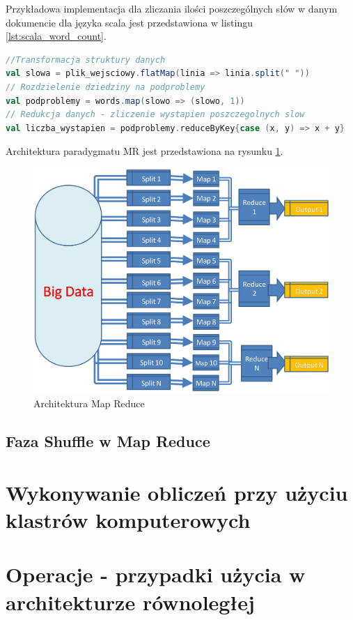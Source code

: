 \newline Przykładowa implementacja dla zliczania ilości poszczególnych słów w danym dokumencie dla języka scala jest przedstawiona w listingu \ref{lst:scala_word_count}.
\begin{lstlisting}[language=scala, caption={Przykład "Word Count"},captionpos=b, label={lst:scala_word_count}]
//Transformacja struktury danych
val slowa = plik_wejsciowy.flatMap(linia => linia.split(" "))
// Rozdzielenie dziedziny na podproblemy
val podproblemy = words.map(slowo => (slowo, 1))
// Redukcja danych - zliczenie wystapien poszczegolnych slow
val liczba_wystapien = podproblemy.reduceByKey{case (x, y) => x + y}
\end{lstlisting}
Architektura paradygmatu MR jest przedstawiona na rysunku \ref{fig:@=map_reduce_schema}.\cite{map_reduce_figure} 
\begin{figure}
	\centering
	\includegraphics[scale=0.3]{map_reduce_flow.png}
	\caption{Architektura Map Reduce}
	\label{fig:@=map_reduce_schema}
\end{figure}
\subsection{Faza Shuffle w Map Reduce}
\section{Wykonywanie obliczeń przy użyciu klastrów komputerowych}
\section{Operacje - przypadki użycia w architekturze równoległej}
